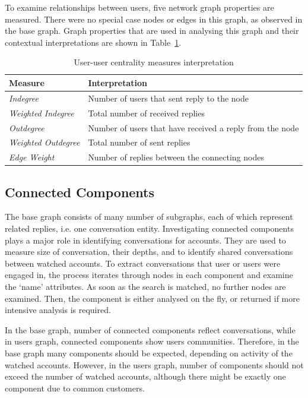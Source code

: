 \documentclass[sigconf]{acmart}
\begin{document}
To examine relationships between users, five network graph properties
are measured. There were no special case nodes or edges in this graph,
as observed in the base graph. Graph properties that are used in
analysing this graph and their contextual interpretations are shown in
Table~\ref{tbl:uucentralitymeasuresinter}.

\begin{table}[!h]
\centering
\begin{tabularx}{\columnwidth}{lX}
\toprule
\textbf{Measure} & \textbf{Interpretation} \\ 
\midrule
{\emph{Indegree}} & Number of users that sent reply to the node \\
{\emph{Weighted Indegree}} & Total number of received replies \\
{\emph{Outdegree}} & Number of users that have received a reply from
                     the node \\ 
{\emph{Weighted Outdegree}} & Total number of sent replies \\
{\emph{Edge Weight}}& Number of replies between the connecting nodes\\
\bottomrule
\end{tabularx}
\caption{User-user centrality measures interpretation}
\label{tbl:uucentralitymeasuresinter}
\end{table}

\subsection{Connected Components}

The base graph consists of many number of subgraphs, each of which
represent related replies, i.e. one conversation entity. Investigating
connected components plays a major role in identifying conversations
for accounts. They are used to measure size of conversation, their
depths, and to identify shared conversations between watched
accounts. To extract conversations that user or users were engaged in,
the process iterates through nodes in each component and examine the
`name' attributes. As soon as the search is matched, no further nodes
are examined. Then, the component is either analysed on the fly, or
returned if more intensive analysis is required.

In the base graph, number of connected components reflect
conversations, while in users graph, connected components show users
communities. Therefore, in the base graph many components should be
expected, depending on activity of the watched accounts. However, in
the users graph, number of components should not exceed the number of
watched accounts, although there might be exactly one component due to
common customers.
\end{document}
